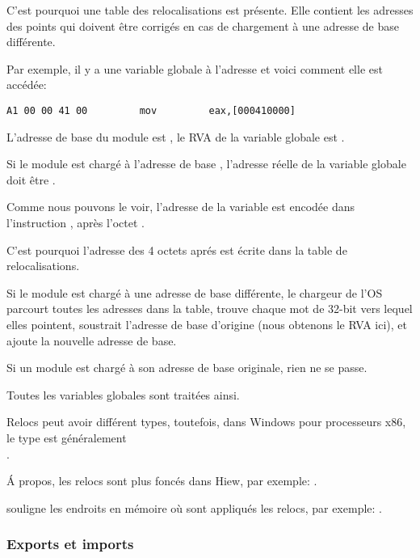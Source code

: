 C'est pourquoi une table des relocalisations est présente.
Elle contient les adresses des points qui doivent être corrigés en cas de chargement
à une adresse de base différente.

Par exemple, il y a une variable globale à l'adresse  et voici comment
elle est accédée:

\begin{lstlisting}
A1 00 00 41 00         mov         eax,[000410000]
\end{lstlisting}

L'adresse de base du module est , le \ac{RVA} de la variable globale est
.

Si le module est chargé à l'adresse de base , l'adresse réelle de la
variable globale doit être .


Comme nous pouvons le voir, l'adresse de la variable est encodée dans l'instruction
, après l'octet .

C'est pourquoi l'adresse des 4 octets aprés  est écrite dans la table de
relocalisations.

Si le module est chargé à une adresse de base différente, le chargeur de l'\ac{OS}
parcourt toutes les adresses dans la table, trouve chaque mot de 32-bit vers lequel
elles pointent, soustrait l'adresse de base d'origine (nous obtenons le \ac{RVA} ici),
et ajoute la nouvelle adresse de base.

Si un module est chargé à son adresse de base originale, rien ne se passe.

Toutes les variables globales sont traitées ainsi.

Relocs peut avoir différent types, toutefois, dans Windows pour processeurs x86, le type est généralement \\
.


Á propos, les relocs sont plus foncés dans Hiew, par exemple: .

\myindex{\olly}
\olly souligne les endroits en mémoire où sont appliqués les relocs, par exemple:
.

\subsubsection{Exports et imports}

